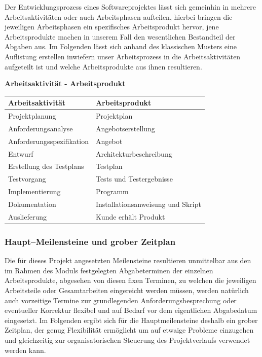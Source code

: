 \documentclass[fontsize=12pt,paper=a4,twoside]{scrartcl}
\begin{document}
Der Entwicklungsprozess eines Softwareprojektes lässt sich gemeinhin in mehrere Arbeitsaktivitäten oder auch Arbeitsphasen aufteilen, hierbei bringen die jeweiligen Arbeitsphasen ein spezifisches Arbeitsprodukt hervor, jene Arbeitsprodukte machen in unserem Fall den wesentlichen Bestandteil der Abgaben aus.\newline
Im Folgenden lässt sich anhand des klassischen Musters eine Auflistung erstellen inwiefern unser Arbeitsprozess in die Arbeitsaktivitäten aufgeteilt ist und welche Arbeitsprodukte aus ihnen resultieren.\newline

\textbf{Arbeitsaktivität - Arbeitsprodukt}

\begin{tabular}{|p{7.5cm}|p{7.5cm}|}\hline
   \textbf{Arbeitsaktivität} & \textbf{Arbeitsprodukt}\\ \hline \hline
   Projektplanung & Projektplan \\ \hline
   Anforderungsanalyse & Angebotserstellung\\ \hline
   Anforderungsspezifikation & Angebot\\ \hline
   Entwurf & Architekturbeschreibung\\ \hline
   Erstellung des Testplans & Testplan\\
   Testvorgang & Tests und Testergebnisse\\ \hline
Implementierung & Programm \\ \hline
Dokumentation & Installationsanweisung und Skript\\ \hline
Auslieferung & Kunde erhält Produkt \\ \hline
\end{tabular}


\subsubsection{Haupt--Meilensteine und grober Zeitplan}

Die für dieses Projekt angesetzten Meilensteine resultieren unmittelbar aus den im Rahmen des Moduls festgelegten Abgabeterminen der einzelnen Arbeitsprodukte, abgesehen von diesen fixen Terminen, zu welchen die jeweiligen Arbeitsteile oder Gesamtarbeiten eingereicht werden müssen, werden natürlich auch vorzeitige Termine zur grundlegenden Anforderungsbesprechung oder eventueller Korrektur flexibel und auf Bedarf vor dem eigentlichen Abgabedatum eingesetzt.\newline
Im Folgenden ergibt sich für die Hauptmeilensteine deshalb ein grober Zeitplan, der genug Flexibilität ermöglicht um auf etwaige Probleme einzugehen und gleichzeitig zur organisatorischen Steuerung des Projektverlaufs verwendet werden kann.\newline
\end{document}
